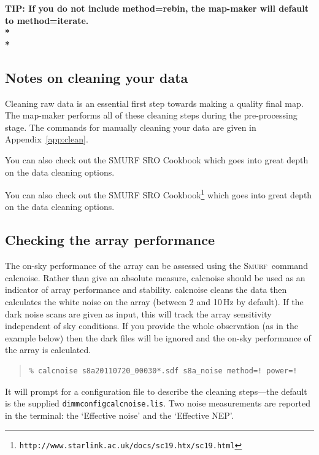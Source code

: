 \documentclass[twoside,11pt]{article}
\newcommand{\htmlref}[2]{#1}
\newenvironment{latexonly}{}{}
\newcommand{\latexhtml}[2]{#1}
\newcommand{\xref}[3]{#1}
\newcommand{\xlabel}[1]{}
\renewcommand{\_}{\texttt{\symbol{95}}}
\newenvironment{myquote}{\begin{quote}\begin{small}}{\end{small}\end{quote}}
\newcommand{\smurf}{\xref{\textsc{Smurf}}{sun258}{}}
\newcommand{\task}[1]{\textsf{#1}}
\newcommand{\calcnoise}{\xref{\task{calcnoise}}{sun258}{CALCNOISE}}
\newcommand{\cref}[3]{\latexhtml{#1~\ref{#2}}{\htmlref{#3}{#2}}}
\begin{document}
\begin{htmlonly}
\textbf{TIP: If you do not include method=rebin, the map-maker will
default to method=iterate.\\*\\*}
\end{htmlonly}


\subsection{\xlabel{clean}Notes on cleaning your data}
\label{sec:clean}

Cleaning raw data is an essential first step towards making a quality
final map. The map-maker performs all of these cleaning steps during
the pre-processing stage. The commands for manually cleaning your data
are given in \cref{Appendix}{app:clean}{Cleaning the Raw Data}.

\begin{htmlonly}
You can also check out the \xref{SMURF SRO Cookbook}{sc19}{} which
goes into great depth on the data cleaning options.
\end{htmlonly}
\begin{latexonly}
You can also check out the SMURF SRO
Cookbook{\footnote{\texttt{http://www.starlink.ac.uk/docs/sc19.htx/sc19.html}}}
which goes into great depth on the data cleaning options.
\end{latexonly}


\subsection{\xlabel{calcnoise}Checking the array performance}
\label{sec:calcnoise}

The on-sky performance of the array can be assessed using the \smurf\
command \calcnoise. Rather than give an absolute measure, \task{calcnoise}
should be used as an indicator of array performance and stability.
\task{calcnoise} cleans the data then calculates the
white noise on the array (between 2 and 10\,Hz by default). If the
dark noise scans are given as input, this will track the array
sensitivity independent of sky conditions. If you provide the whole
observation (as in the example below) then the dark files will be
ignored and the on-sky performance of the array is calculated.

\begin{myquote}
\begin{verbatim}
% calcnoise s8a20110720_00030*.sdf s8a_noise method=! power=!
\end{verbatim}
\end{myquote}
It will prompt for a configuration file to describe the cleaning
steps---the default is the supplied \texttt{dimmconfig\_calcnoise.lis}.
Two noise measurements are reported in the terminal: the
`Effective noise' and the `Effective NEP'.
\end{document}
